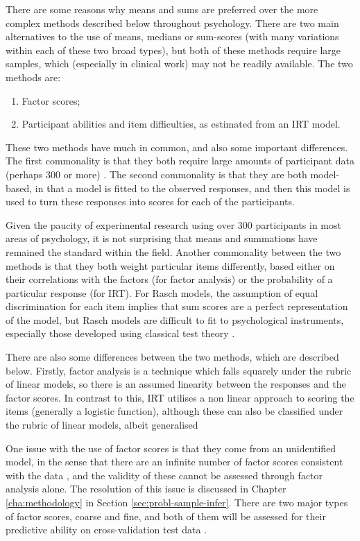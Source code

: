There are some reasons why means and sums are preferred over the more complex methods described below throughout psychology. There are two main alternatives to the use of means, medians or sum-scores (with many variations within each of these two broad types), but both of these methods require large samples, which (especially in clinical work) may not be readily available. 
The two methods are:


\begin{enumerate}
\item Factor scores;
\item Participant abilities and item difficulties, as estimated from an IRT model.
\end{enumerate}

These two methods have much in common, and also some important differences. The first commonality is that they both require large amounts of participant data (perhaps 300 or more) \cite{van1997handbook, henson2006use}. The second commonality is that they are both model-based, in that a model is fitted to the observed responses, and then this model is used to turn these responses into scores for each of the participants. 

Given the paucity of experimental research using over 300 participants in most areas of psychology, it is not surprising that means and summations have remained the standard within the field. Another commonality between the two methods is that they both weight particular items differently, based either on their correlations with the factors (for factor analysis) or the probability of a particular response (for IRT). For Rasch models, the assumption of equal discrimination for each item implies that sum scores are a perfect representation of the model, but Rasch models are difficult to fit to psychological instruments, especially those developed using classical test theory \cite{borsboom2006attack}.   

There are also some differences between the two methods, which are described below. Firstly, factor analysis is a technique which falls squarely under the rubric of linear models\cite{venables2002modern}, so there is an assumed linearity between the responses and the factor scores. In contrast to this, IRT utilises a non linear approach to scoring the items (generally a logistic function), although these can also be classified under the rubric of linear models, albeit generalised \cite{venables2002modern}

One issue with the use of factor scores is that they come from an unidentified model, in the sense that there are an infinite number of factor scores consistent with the data \cite{grice2001computingit}, and the validity of these cannot be assessed through factor analysis alone. The resolution of this issue is discussed in Chapter \ref{cha:methodology} in Section \ref{sec:probl-sample-infer}. There are two major types of factor scores, coarse and fine, and both of them will be assessed for their predictive ability on cross-validation test data \cite{grice2001computingit}.

